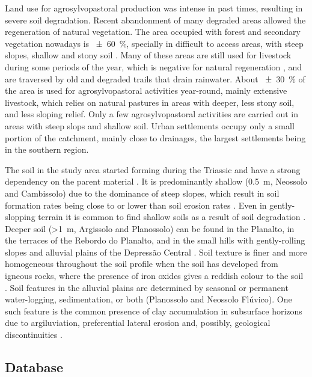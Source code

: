 Land use for agrosylvopastoral production was intense in past times, resulting in severe soil 
degradation. Recent abandonment of many degraded areas allowed the regeneration of natural 
vegetation. The area occupied with forest and secondary vegetation nowadays is \SI{\pm60}{\percent},
specially in difficult to access areas, with steep slopes, shallow and stony soil 
\cite{SamuelRosaEtAl2011a}. Many of these areas are still used for livestock during some periods of
the year, which is negative for natural regeneration \cite{ScheneiderEtAl1978,HackEtAl2005}, and 
are traversed by old and degraded trails that drain rainwater. About \SI{\pm30}{\percent} of the 
area is used for agrosylvopastoral activities year-round, mainly extensive livestock, which relies 
on natural pastures in areas with deeper, less stony soil, and less sloping relief. Only a few 
agrosylvopastoral activities are carried out in areas with steep slops and shallow soil. Urban
settlements occupy only a small portion of the catchment, mainly close to drainages, the largest
settlements being in the southern region.

The soil in the study area started forming during the Triassic and have a strong dependency on the 
parent material \cite{NascimentoEtAl2010}. It is predominantly shallow (\SI{0.5}{\metre}, Neossolo 
and Cambissolo) due to the dominance of steep slopes, which result in soil formation rates being 
close to or lower than soil erosion rates \cite{DalmolinEtAl2006a}. Even in gently-slopping terrain
it is common to find shallow soils as a result of soil degradation \cite{Moser1990, MouraBueno2012}.
Deeper soil (\SI{>1}{\metre}, Argissolo and Planossolo) can be found in the Planalto, in the 
terraces of the Rebordo do Planalto, and in the small hills with gently-rolling slopes and alluvial 
plains of the Depressão Central \cite{Moser1990,MiguelEtAl2012}. Soil texture is finer and more 
homogeneous throughout the soil profile when the soil has developed from igneous rocks, where the 
presence of iron oxides gives a reddish colour to the soil \cite{MiguelEtAl2012}. Soil features in 
the alluvial plains are determined by seasonal or permanent water-logging, sedimentation, or both 
(Planossolo and Neossolo Flúvico). One such feature is the common presence of clay accumulation in
subsurface horizons due to argiluviation, preferential lateral erosion and, possibly, geological
discontinuities \cite{PieriniEtAl2002,MiguelEtAl2012}.

\subsection{Database}
\label{sec:intro-database}

